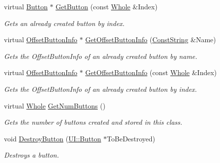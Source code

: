 \begin{DoxyCompactItemize}
virtual \hyperlink{classphys_1_1UI_1_1Button}{Button} $\ast$ \hyperlink{classphys_1_1UI_1_1Window_aa0fb8f15e5a0ee2ac46631f56e23fa36}{GetButton} (const \hyperlink{namespacephys_a460f6bc24c8dd347b05e0366ae34f34a}{Whole} \&Index)
\begin{DoxyCompactList}\small\item\em Gets an already created button by index. \item\end{DoxyCompactList}\item 
virtual \hyperlink{structphys_1_1UI_1_1ResizingInfo}{OffsetButtonInfo} $\ast$ \hyperlink{classphys_1_1UI_1_1Window_ad0d6b12c2f69ea1bc580bba7e69949a5}{GetOffsetButtonInfo} (\hyperlink{namespacephys_a5ce5049f8b4bf88d6413c47b504ebb31}{ConstString} \&Name)
\begin{DoxyCompactList}\small\item\em Gets the OffsetButtonInfo of an already created button by name. \item\end{DoxyCompactList}\item 
virtual \hyperlink{structphys_1_1UI_1_1ResizingInfo}{OffsetButtonInfo} $\ast$ \hyperlink{classphys_1_1UI_1_1Window_a965b9fbfa8fa73b351f468a65ca73dcc}{GetOffsetButtonInfo} (const \hyperlink{namespacephys_a460f6bc24c8dd347b05e0366ae34f34a}{Whole} \&Index)
\begin{DoxyCompactList}\small\item\em Gets the OffsetButtonInfo of an already created button by index. \item\end{DoxyCompactList}\item 
virtual \hyperlink{namespacephys_a460f6bc24c8dd347b05e0366ae34f34a}{Whole} \hyperlink{classphys_1_1UI_1_1Window_a7eab9b4e1607a2b796072f60b6e3e0cd}{GetNumButtons} ()
\begin{DoxyCompactList}\small\item\em Gets the number of buttons created and stored in this class. \item\end{DoxyCompactList}\item 
void \hyperlink{classphys_1_1UI_1_1Window_a5a5bc10054d6e1d709b3b683a5554bf4}{DestroyButton} (\hyperlink{classphys_1_1UI_1_1Button}{UI::Button} $\ast$ToBeDestroyed)
\begin{DoxyCompactList}\small\item\em Destroys a button. \item\end{DoxyCompactList}\item 

\end{DoxyCompactItemize}
